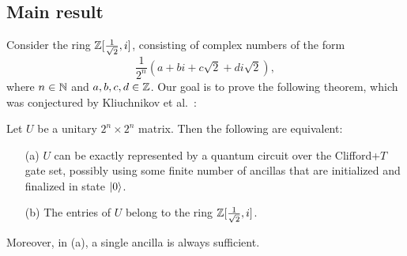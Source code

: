 \subsection{Main result} %
\label{sub:main_result}
Consider the ring $\mathbb{Z}[\frac1{\sqrt{2}},i]$, consisting of complex numbers of the form
\[
  \frac{1}{2^n} (a + bi + c\sqrt{2} + di\sqrt{2}),
\]
where $n\in\mathbb{N}$ and $a,b,c,d\in\mathbb{Z}$. Our goal is to prove the following theorem, which was
conjectured by Kliuchnikov et al.~{\cite{Kliuchnikov-et-al}}:
\begin{theorem}\label{thm-main}
  Let $U$ be a unitary $2^n\times 2^n$ matrix. Then the following are equivalent:
\begin{enumerate}\alphalabels
  \item[(a)] $U$ can be exactly represented by a quantum circuit over the Clifford+$T$ gate set,
    possibly using some finite number of ancillas that are initialized and finalized in state $\left\vert{0}\right\rangle$.
  \item[(b)] The entries of $U$ belong to the ring $\mathbb{Z}[\frac1{\sqrt{2}},i]$.
\end{enumerate}
Moreover, in (a), a single ancilla is always sufficient.
\end{theorem}
